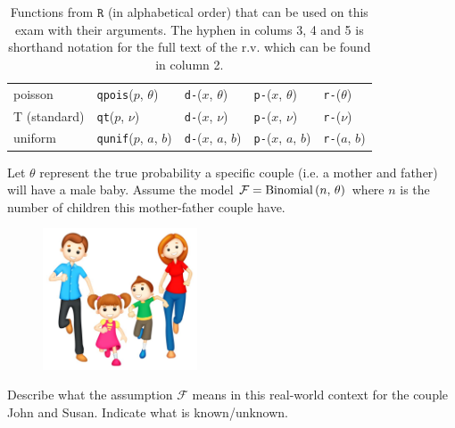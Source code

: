 \documentclass[12pt]{article}
\begin{document}
\begin{table}[htp]
\begin{tabular}{l | llll}

poisson & \texttt{qpois}($p$, $\theta$) 
& \texttt{d-}($x$, $\theta$)
& \texttt{p-}($x$, $\theta$) 
& \texttt{r-}($\theta$) \\

T (standard) & \texttt{qt}($p$, $\nu$) 
& \texttt{d-}($x$, $\nu$) 
& \texttt{p-}($x$, $\nu$)
& \texttt{r-}($\nu$) \\


uniform & \texttt{qunif}($p$, $a$, $b$) 
& \texttt{d-}($x$, $a$, $b$)
& \texttt{p-}($x$, $a$, $b$) 
& \texttt{r-}($a$, $b$) \\


\end{tabular}
\caption{Functions from $\texttt{R}$ (in alphabetical order) that can be used on this exam with their arguments. The hyphen in colums 3, 4 and 5 is shorthand notation for the full text of the r.v. which can be found in column 2.
}
\label{tab:eqs}
\end{table}



\problem Let $\theta$ represent the true probability a specific couple (i.e. a mother and father) will have a male baby. Assume the model $\mathcal{F} = \mathrm{Binomial}\left(n,\,\theta\right)$ where $n$ is the number of children this mother-father couple have.


\begin{figure}[htp]
\centering
\includegraphics[width=1.8in]{family.jpg}
\end{figure}

\benum

 Describe what the assumption $\mathcal{F}$ means in this real-world context for the couple John and Susan. Indicate what is known/unknown.
\end{document}
